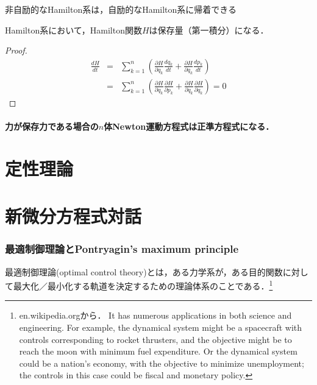 \documentclass[uplatex,dvipdfmx]{jsreport}
\begin{document}
\begin{proposition}
    非自励的なHamilton系は，自励的なHamilton系に帰着できる
\end{proposition}

\begin{proposition}\label{prop-Hamilton-invariants}
    Hamilton系において，Hamilton関数$H$は保存量（第一積分）になる．
\end{proposition}
\begin{proof}
    \begin{eqnarray*}
        \frac{dH}{dt}&=&\sum^n_{k=1}\left( \frac{\partial H}{\partial q_k}\frac{dq_k}{dt}+\frac{\partial H}{\partial q_k}\frac{dp_k}{dt} \right) \\
        &=& \sum^n_{k=1}\left( \frac{\partial H}{\partial q_k}\frac{\partial H}{\partial p_k}+\frac{\partial H}{\partial q_k}\frac{\partial H}{\partial q_k} \right) =0
    \end{eqnarray*}
\end{proof}

\subsection{力が保存力である場合の$n$体Newton運動方程式は正準方程式になる．}

\part{定性理論}

\part{新微分方程式対話}

\section{最適制御理論とPontryagin's maximum principle}

最適制御理論(optimal control theory)とは，ある力学系が，ある目的関数に対して最大化／最小化する軌道を決定するための理論体系のことである．\footnote{en.wikipedia.orgから． It has numerous applications in both science and engineering. For example, the dynamical system might be a spacecraft with controls corresponding to rocket thrusters, and the objective might be to reach the moon with minimum fuel expenditure. Or the dynamical system could be a nation's economy, with the objective to minimize unemployment; the controls in this case could be fiscal and monetary policy.}
\end{document}
